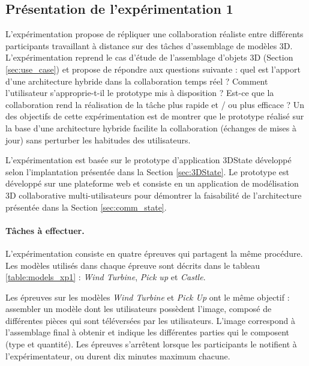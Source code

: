 
\subsection{Présentation de l'expérimentation 1}

L'expérimentation propose de répliquer une collaboration réaliste entre 
différents participants travaillant à distance sur des tâches d'assemblage de 
modèles \gls{3D}. L'expérimentation reprend le cas d'étude de l'assemblage 
d'objets \gls{3D} (Section \ref{sec:use_case}) et propose de répondre aux 
questions suivante : quel est l'apport d'une architecture hybride dans la 
collaboration temps réel ? Comment l'utilisateur s'approprie-t-il le prototype mis à 
disposition ? Est-ce que la collaboration rend la réalisation de la tâche plus rapide 
et / ou plus efficace ? Un des objectifs de cette expérimentation est de montrer 
que le prototype réalisé sur la base d'une architecture hybride facilite la 
collaboration (échanges de mises à jour) sans perturber les habitudes des 
utilisateurs.

L'expérimentation est basée sur le prototype d'application 3DState développé 
selon l'implantation présentée dans la Section \ref{sec:3DState}.
Le prototype est développé sur une plateforme web et consiste en un application 
de modélisation \gls{3D} collaborative multi-utilisateurs pour démontrer la 
faisabilité de l'architecture présentée dans la Section \ref{sec:comm_state}. 


\paragraph{Tâches à effectuer.}
L'expérimentation consiste en quatre épreuves qui partagent la même procédure.
Les modèles utilisés dans chaque épreuve sont décrits dans le tableau 
\ref{table:models_xp1} : \textit{Wind Turbine}, \textit{Pick up} et \textit{Castle}. 

Les épreuves sur les modèles \textit{Wind Turbine} et \textit{Pick Up} ont le 
même objectif : 
assembler un modèle dont les utilisateurs possèdent l'image, composé de 
différentes pièces qui sont téléversées par les utilisateurs. L'image correspond à 
l'assemblage final à obtenir et indique les différentes parties qui le 
composent (type et quantité). Les épreuves s'arrêtent lorsque les participants 
le notifient à l'expérimentateur, ou durent dix minutes maximum chacune.

